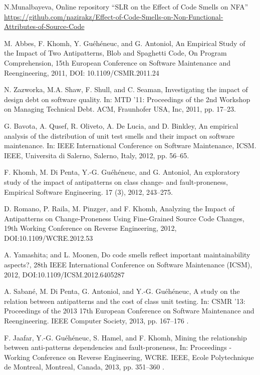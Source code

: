 \documentclass{sigchi}
\begin{document}
\begin{thebibliography}{2}
	 N.Munalbayeva, Online repository “SLR on the Effect of Code Smells on NFA” \href{https://github.com/nazirakz/Effect-of-Code-Smells-on-Non-Functional-Attributes-of-Source-Code}{https://github.com/nazirakz/Effect-of-Code-Smells-on-Non-Functional-Attributes-of-Source-Code}
	
	 M. Abbes, F. Khomh, Y. Guéhéneuc, and G. Antoniol, An Empirical Study of the Impact of Two Antipatterns, Blob and Spaghetti Code, On Program Comprehension, 15th European Conference on Software Maintenance and Reengineering, 2011, DOI: 10.1109/CSMR.2011.24
	
	 N. Zazworka, M.A. Shaw, F. Shull, and C. Seaman, Investigating the impact of design debt on software quality. In: MTD ’11: Proceedings of the 2nd Workshop on Managing Technical Debt. ACM, Fraunhofer USA, Inc, 2011, pp. 17–23.
	
	 G. Bavota, A. Qusef, R. Oliveto, A. De Lucia, and D. Binkley, An empirical analysis of the distribution of unit test smells and their impact on software maintenance. In: IEEE International Conference on Software Maintenance, ICSM. IEEE, Universita di Salerno, Salerno, Italy, 2012, pp. 56–65.
	
	F. Khomh, M. Di Penta, Y.-G. Guéhéneuc, and G. Antoniol, An exploratory study of the impact of antipatterns on class change- and fault-proneness, Empirical Software Engineering. 17 (3), 2012, 243–275.
	
	 D. Romano, P. Raila, M. Pinzger, and F. Khomh, Analyzing the Impact of Antipatterns on Change-Proneness Using Fine-Grained Source Code Changes, 19th Working Conference on Reverse Engineering, 2012, DOI:10.1109/WCRE.2012.53
	
	A. Yamashita; and L. Moonen, Do code smells reflect important maintainability aspects?, 28th IEEE International Conference on Software Maintenance (ICSM), 2012, DOI:10.1109/ICSM.2012.6405287
	
	 A. Sabané, M. Di Penta, G. Antoniol, and Y.-G. Guéhéneuc, A study on the relation between antipatterns and the cost of class unit testing. In: CSMR ’13: Proceedings of the 2013 17th European Conference on Software Maintenance and Reengineering. IEEE Computer Society, 2013, pp. 167–176 .
	
	 F. Jaafar, Y.-G. Guéhéneuc, S. Hamel, and F. Khomh, Mining the relationship between anti-patterns dependencies and fault-proneness, In: Proceedings - Working Conference on Reverse Engineering, WCRE. IEEE, Ecole Polytechnique de Montreal, Montreal, Canada, 2013, pp. 351–360 .
	

\end{thebibliography}
\end{document}
